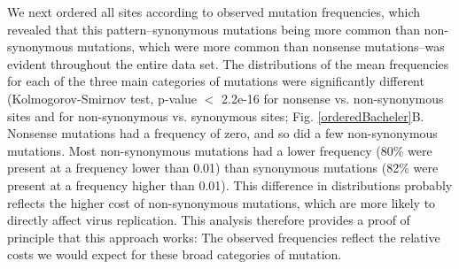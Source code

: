 \documentclass{article}
\begin{document}
We next ordered all sites according to observed mutation frequencies, which revealed that this pattern--synonymous mutations being more common than non-synonymous mutations, which were more common than nonsense mutations--was evident throughout the entire data set. The distributions of the mean frequencies for each of the three main categories of mutations were significantly different (Kolmogorov-Smirnov test, p-value $<$ 2.2e-16 for nonsense vs. non-synonymous sites and for non-synonymous vs. synonymous sites; Fig. \ref{orderedBacheler}B. Nonsense mutations had a frequency of zero, and so did a few non-synonymous mutations. Most non-synonymous mutations had a lower frequency (80\% were present at a frequency lower than 0.01) than synonymous mutations (82\% were present at a frequency higher than 0.01). This difference in distributions probably reflects the higher cost of non-synonymous mutations, which are more likely to directly affect virus replication. 
This analysis therefore provides a proof of principle that this approach works: The observed frequencies reflect the relative costs we would expect for these broad categories of mutation.  
\end{document}
